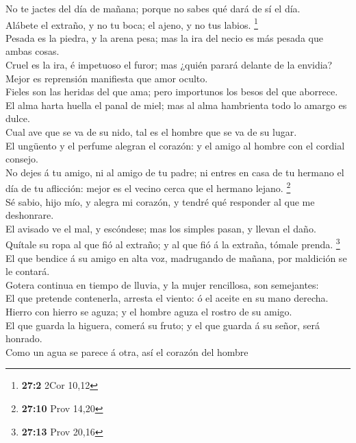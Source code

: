  No te jactes del día de mañana; porque no sabes qué dará de
sí el día.\\
 Alábete el extraño, y no tu boca; el ajeno, y no tus
labios. \footnote{\textbf{27:2} 2Cor 10,12}\\
 Pesada es la piedra, y la arena pesa; mas la ira del necio
es más pesada que ambas cosas.\\
 Cruel es la ira, é impetuoso el furor; mas ¿quién parará
delante de la envidia?\\
 Mejor es reprensión manifiesta que amor oculto.\\
 Fieles son las heridas del que ama; pero importunos los
besos del que aborrece.\\
 El alma harta huella el panal de miel; mas al alma
hambrienta todo lo amargo es dulce.\\
 Cual ave que se va de su nido, tal es el hombre que se va
de su lugar.\\
 El ungüento y el perfume alegran el corazón: y el amigo al
hombre con el cordial consejo.\\
 No dejes á tu amigo, ni al amigo de tu padre; ni entres en
casa de tu hermano el día de tu aflicción: mejor es el vecino cerca que
el hermano lejano. \footnote{\textbf{27:10} Prov 14,20}\\
 Sé sabio, hijo mío, y alegra mi corazón, y tendré qué
responder al que me deshonrare.\\
 El avisado ve el mal, y escóndese; mas los simples pasan,
y llevan el daño.\\
 Quítale su ropa al que fió al extraño; y al que fió á la
extraña, tómale prenda. \footnote{\textbf{27:13} Prov 20,16}\\
 El que bendice á su amigo en alta voz, madrugando de
mañana, por maldición se le contará.\\
 Gotera continua en tiempo de lluvia, y la mujer
rencillosa, son semejantes:\\
 El que pretende contenerla, arresta el viento: ó el aceite
en su mano derecha.\\
 Hierro con hierro se aguza; y el hombre aguza el rostro de
su amigo.\\
 El que guarda la higuera, comerá su fruto; y el que guarda
á su señor, será honrado.\\
 Como un agua se parece á otra, así el corazón del hombre
